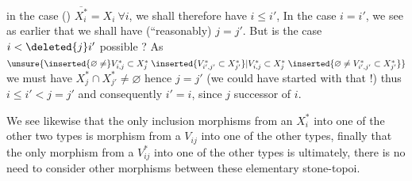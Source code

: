 in the case ()  $\overline{X_i^*}=X_i\ \forall i$, we shall therefore have $i\leq i'$, In  the case $i=i'$, we see as earlier that we shall have (``reasonably) $j=j'$. But is the case $i<\deleted{j}i'$ possible ? As $\unsure{\inserted{\varnothing\ne}V_{i,j}^*\subset X_j^*\;\inserted{V_{i',j'}^*\subset X_{j'}^*}|V_{i,j}^*\subset X_j^*\;\inserted{\varnothing\ne V_{i',j'}^*\subset X_{j'}^*}}$ we must have $X_j^*\cap X_{j'}^*\ne\varnothing$ hence $j=j'$ (we could have started with that !)
thus  $i\leq i'<j=j'$ and consequently $i'=i$, since $j$ successor of $i$.

We see likewise that the only inclusion morphisms from an $X_i^*$ into one of the other two types is
  morphism from a $V_{ij}$ into one of the other types,  finally that the only morphism from a $V_{ij}^*$ into one of the other types is
ultimately, there is no need to consider other morphisms between these  elementary stone-topoi.
